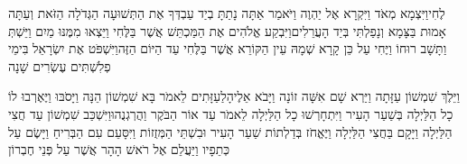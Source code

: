 \documentclass[../main/main.tex]{subfiles}
\begin{document}
\begin{multicols*}{\ncols}
לֶחִי\PreVerseSpace{}וַיִּצְמָא מְאֹד וַיִּקְרָא אֶל יַהְוֶה וַיֹּאמַר אַתָּה נָתַתָּ בְיַד עַבְדְּךָ אֶת הַתְּשׁוּעָה הַגְּדֹלָה הַזֹּאת וְעַתָּה אָמוּת בַּצָּמָא וְנָפַלְתִּי בְּיַד הָעֲרֵלִים\PreVerseSpace{}וַיִּבְקַע אֱלֹהִים אֶת הַמַּכְתֵּשׁ אֲשֶׁר בַּלֶּחִי וַיֵּצְאוּ מִמֶּנּוּ מַיִם וַיֵּשְׁתְּ וַתָּשָׁב רוּחוֹ וַיֶּחִי עַל כֵּן קָרָא שְׁמָהּ עֵין הַקּוֹרֵא אֲשֶׁר בַּלֶּחִי עַד הַיּוֹם הַזֶּה\PreVerseSpace{}וַיִּשְׁפֹּט אֶת יִשְׂרָאֵל בִּימֵי פְלִשְׁתִּים עֶשְׂרִים שָׁנָה\OpenSection{}\par
{}וַיֵּלֶךְ שִׁמְשׁוֹן עַזָּתָה וַיַּרְא שָׁם אִשָּׁה זוֹנָה וַיָּבֹא אֵלֶיהָ\PreVerseSpace{}לַעַזָּתִים לֵאמֹר בָּא שִׁמְשׁוֹן הֵנָּה וַיָּסֹבּוּ וַיֶּאֶרְבוּ לוֹ כָל הַלַּיְלָה בְּשַׁעַר הָעִיר וַיִּתְחָרְשׁוּ כָל הַלַּיְלָה לֵאמֹר עַד אוֹר הַבֹּקֶר וַהֲרְגְנֻהוּ\PreVerseSpace{}וַיִּשְׁכַּב שִׁמְשׁוֹן עַד חֲצִי הַלַּיְלָה וַיָּקָם בַּחֲצִי הַלַּיְלָה וַיֶּאֱחֹז בְּדַלְתוֹת שַׁעַר הָעִיר וּבִשְׁתֵּי הַמְּזֻזוֹת וַיִּסָּעֵם עִם הַבְּרִיחַ וַיָּשֶׂם עַל כְּתֵפָיו וַיַּעֲלֵם אֶל רֹאשׁ הָהָר אֲשֶׁר עַל פְּנֵי חֶבְרוֹן\OpenSection{}\par

\end{multicols*}
\end{document}

